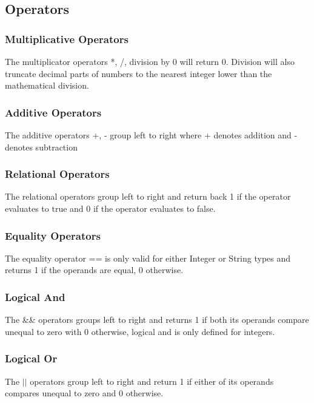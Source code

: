 \documentclass[12pt]{article}
\begin{document}
\subsection{Operators}

\subsubsection{Multiplicative Operators}
The multiplicator operators *, /, %
division by 0 will return 0.  Division will also truncate decimal parts of numbers to the nearest integer lower than the mathematical division.

\subsubsection{Additive Operators}
The additive operators +, - group left to right where + denotes addition and - denotes subtraction

\subsubsection{Relational Operators}
The relational operators group left to right and return back 1 if the operator evaluates to true and 0 if the operator evaluates to false. 
 
\subsubsection{Equality Operators}
The equality operator == is only valid for either Integer or String types and returns 1 if the operands are equal, 0 otherwise. 

\subsubsection{Logical And}
The \&\& operators groups left to right and returns 1 if both its operands
compare unequal to zero with 0 otherwise, logical and is only defined for integers.

\subsubsection{Logical Or}
The $\vert \vert$ operators group left to right and return 1 if either of its operands compares unequal to zero and 0 otherwise.
\end{document}
